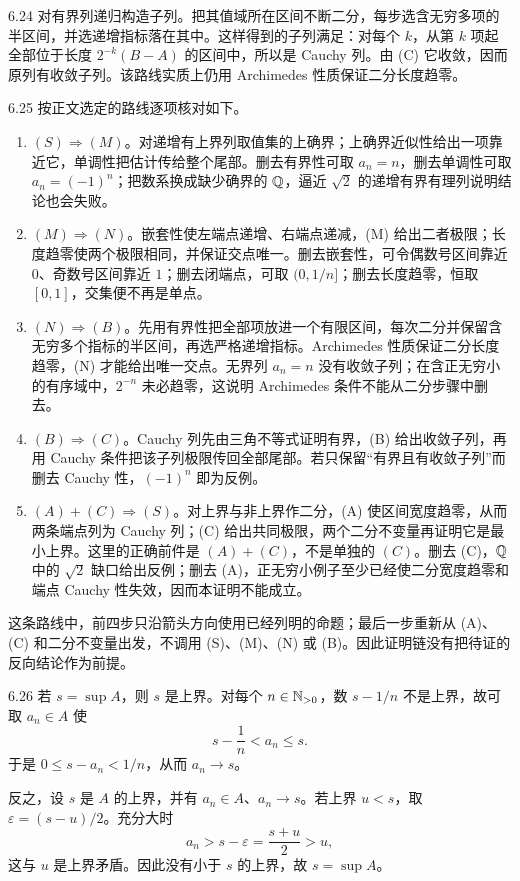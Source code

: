 \begin{solution}{6.24}
对有界列递归构造子列。把其值域所在区间不断二分，每步选含无穷多项的半区间，并选递增指标落在其中。这样得到的子列满足：对每个 \(k\)，从第 \(k\) 项起全部位于长度 \(2^{-k}(B-A)\) 的区间中，所以是 Cauchy 列。由 (C) 它收敛，因而原列有收敛子列。该路线实质上仍用 Archimedes 性质保证二分长度趋零。
\end{solution}

\begin{solution}{6.25}
按正文选定的路线逐项核对如下。

\begin{enumerate}[label=(\arabic*)]
 \item \((S)\Rightarrow(M)\)。对递增有上界列取值集的上确界；上确界近似性给出一项靠近它，单调性把估计传给整个尾部。删去有界性可取 \(a_n=n\)，删去单调性可取 \(a_n=(-1)^n\)；把数系换成缺少确界的 \(\mathbb{Q}\)，逼近 \(\sqrt2\) 的递增有界有理列说明结论也会失败。

 \item \((M)\Rightarrow(N)\)。嵌套性使左端点递增、右端点递减，(M) 给出二者极限；长度趋零使两个极限相同，并保证交点唯一。删去嵌套性，可令偶数号区间靠近 \(0\)、奇数号区间靠近 \(1\)；删去闭端点，可取 \((0,1/n]\)；删去长度趋零，恒取 \([0,1]\)，交集便不再是单点。

 \item \((N)\Rightarrow(B)\)。先用有界性把全部项放进一个有限区间，每次二分并保留含无穷多个指标的半区间，再选严格递增指标。Archimedes 性质保证二分长度趋零，(N) 才能给出唯一交点。无界列 \(a_n=n\) 没有收敛子列；在含正无穷小的有序域中，\(2^{-n}\) 未必趋零，这说明 Archimedes 条件不能从二分步骤中删去。

 \item \((B)\Rightarrow(C)\)。Cauchy 列先由三角不等式证明有界，(B) 给出收敛子列，再用 Cauchy 条件把该子列极限传回全部尾部。若只保留“有界且有收敛子列”而删去 Cauchy 性，\((-1)^n\) 即为反例。

 \item \((A)+(C)\Rightarrow(S)\)。对上界与非上界作二分，(A) 使区间宽度趋零，从而两条端点列为 Cauchy 列；(C) 给出共同极限，两个二分不变量再证明它是最小上界。这里的正确前件是 \((A)+(C)\)，不是单独的 \((C)\)。删去 (C)，\(\mathbb{Q}\) 中的 \(\sqrt2\) 缺口给出反例；删去 (A)，正无穷小例子至少已经使二分宽度趋零和端点 Cauchy 性失效，因而本证明不能成立。
\end{enumerate}

这条路线中，前四步只沿箭头方向使用已经列明的命题；最后一步重新从 (A)、(C) 和二分不变量出发，不调用 (S)、(M)、(N) 或 (B)。因此证明链没有把待证的反向结论作为前提。
\end{solution}

\begin{solution}{6.26}
若 \(s=\sup A\)，则 \(s\) 是上界。对每个 \(n\in\mathbb{N}_{>0}\)，数 \(s-1/n\) 不是上界，故可取 \(a_n\in A\) 使
\[
 s-\frac1n<a_n\le s.
\]
于是 \(0\le s-a_n<1/n\)，从而 \(a_n\to s\)。

反之，设 \(s\) 是 \(A\) 的上界，并有 \(a_n\in A\)、\(a_n\to s\)。若上界 \(u<s\)，取 \(\varepsilon=(s-u)/2\)。充分大时
\[
 a_n>s-\varepsilon=\frac{s+u}{2}>u,
\]
这与 \(u\) 是上界矛盾。因此没有小于 \(s\) 的上界，故 \(s=\sup A\)。
\end{solution}

